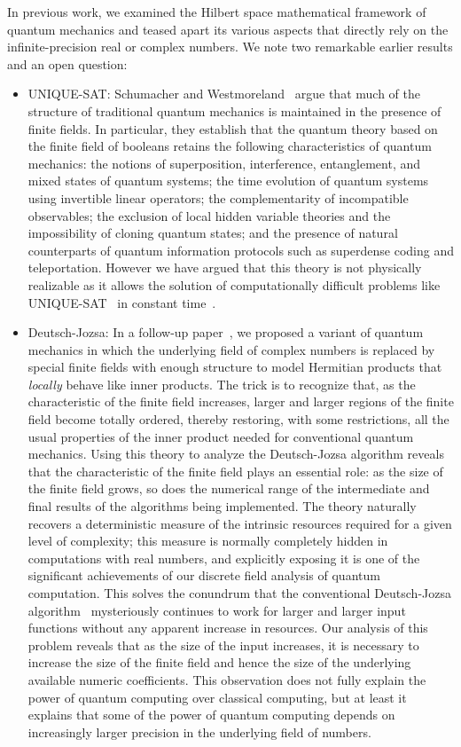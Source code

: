 \documentclass{article}
\theoremstyle{remark}
\begin{document}
In
previous work, we examined the Hilbert space mathematical framework of
quantum mechanics and teased apart its various aspects that directly
rely on the infinite-precision real or complex numbers. We note two
remarkable earlier results and an open question:
\begin{itemize}
\item UNIQUE-SAT: Schumacher and
  Westmoreland~\cite{Schumacher2012-SCHMQT} argue that much of the
  structure of traditional quantum mechanics is maintained in the
  presence of finite fields. In particular, they establish that the
  quantum theory based on the finite field of booleans retains the
  following characteristics of quantum mechanics: the notions of
  superposition, interference, entanglement, and mixed states of
  quantum systems; the time evolution of quantum systems using
  invertible linear operators; the complementarity of incompatible
  observables; the exclusion of local hidden variable theories and the
  impossibility of cloning quantum states; and the presence of natural
  counterparts of quantum information protocols such as superdense
  coding and teleportation. However we have argued that this theory is
  not physically realizable as it allows the solution of
  computationally difficult problems like
  UNIQUE-SAT~\cite{Valiant198685} in constant time~\cite{usat}.

\item Deutsch-Jozsa: In a follow-up paper~\cite{DQT2014}, we proposed
  a variant of quantum mechanics in which the underlying field of
  complex numbers is replaced by special finite fields with enough
  structure to model Hermitian products that \emph{locally} behave
  like inner products. The trick is to recognize that, as the
  characteristic of the finite field increases, larger and larger
  regions of the finite field become totally ordered, thereby
  restoring, with some restrictions, all the usual properties of the
  inner product needed for conventional quantum mechanics. Using this
  theory to analyze the Deutsch-Jozsa algorithm reveals that the
  characteristic of the finite field plays an essential role: as the
  size of the finite field grows, so does the numerical range of the
  intermediate and final results of the algorithms being implemented.
  The theory naturally recovers a deterministic measure of the
  intrinsic resources required for a given level of complexity; this
  measure is normally completely hidden in computations with real
  numbers, and explicitly exposing it is one of the significant
  achievements of our discrete field analysis of quantum computation.
  This solves the conundrum that the conventional Deutsch-Jozsa
  algorithm~\cite{DeutschJozsa1992,Jaeger2007}
  mysteriously continues to work for larger and larger input
  functions without any apparent increase in resources.  Our analysis
  of this problem reveals that as the size of the input increases, it
  is necessary to increase the size of the finite field and hence the
  size of the underlying available numeric coefficients.  This
  observation does not fully explain the power of quantum computing
  over classical computing, but at least it explains that some of the
  power of quantum computing depends on increasingly larger precision
  in the underlying field of numbers.


\end{itemize}
\end{document}
